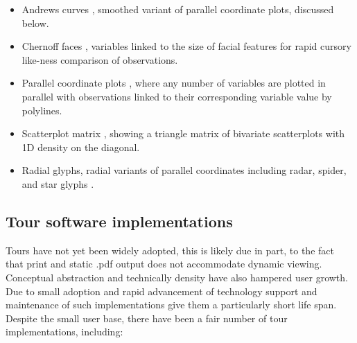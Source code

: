 \documentclass{monashthesis}
\begin{document}
\begin{itemize}
  \begin{itemize}
  \tightlist
  \item
    Andrews curves \autocite{andrews_plots_1972}, smoothed variant of
    parallel coordinate plots, discussed below.
  \item
    Chernoff faces \autocite{chernoff_use_1973}, variables linked to the
    size of facial features for rapid cursory like-ness comparison of
    observations.
  \item
    Parallel coordinate plots \autocite{ocagne_coordonnees_1885}, where
    any number of variables are plotted in parallel with observations
    linked to their corresponding variable value by polylines.
  \item
    Scatterplot matrix \autocite{becker_brushing_1987}, showing a
    triangle matrix of bivariate scatterplots with 1D density on the
    diagonal.
  \item
    Radial glyphs, radial variants of parallel coordinates including
    radar, spider, and star glyphs \autocite{siegel_surgical_1972}.
  \end{itemize}
\end{itemize}

\subsection{Tour software
implementations}\label{tour-software-implementations}

Tours have not yet been widely adopted, this is likely due in part, to
the fact that print and static .pdf output does not accommodate dynamic
viewing. Conceptual abstraction and technically density have also
hampered user growth. Due to small adoption and rapid advancement of
technology support and maintenance of such implementations give them a
particularly short life span. Despite the small user base, there have
been a fair number of tour implementations, including:
\end{document}
